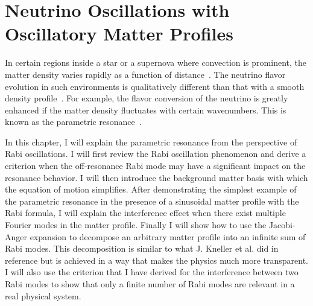 
\chapter{\label{chap:matter}Neutrino Oscillations with Oscillatory Matter Profiles}

In certain regions inside a star or a supernova where convection is prominent, the matter density varies rapidly as a function of distance~\cite{Muller2015, Couch2015}. The neutrino flavor evolution in such environments is qualitatively different than that with a smooth density profile~\cite{Krastev1989, Loreti1994,Akhmedov2000, Friedland2006,Kneller2010,Kneller2013,Patton2014}. For example, the flavor conversion of the neutrino is greatly enhanced if the matter density fluctuates with certain wavenumbers. This is known as the parametric resonance~\cite{Krastev1989,Akhmedov1999}.

In this chapter, I will explain the parametric resonance from the perspective of Rabi oscillations. I will first review the Rabi oscillation phenomenon and derive a criterion when the off-resonance Rabi mode may have a significant impact on the resonance behavior. I will then introduce the background matter basis with which the equation of motion simplifies. After demonstrating the simplest example of the parametric resonance in the presence of a sinusoidal matter profile with the Rabi formula, I will explain the interference effect when there exist multiple Fourier modes in the matter profile. Finally I will show how to use the Jacobi-Anger expansion to decompose an arbitrary matter profile into an infinite sum of Rabi modes. This decomposition is similar to what J. Kneller et al. did in reference \cite{Kneller2013,Patton2014} but is achieved in a way that makes the physics much more transparent. I will also use the criterion that I have derived for the interference between two Rabi modes to show that only a finite number of Rabi modes are relevant in a real physical system.




